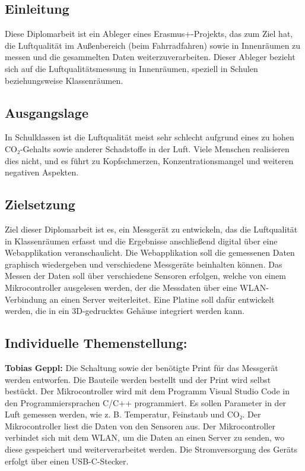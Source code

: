 \begin{inhalt}
\renewcommand*\chapterpagestyle{scrheadings}
\chapter{Einleitung}

Diese Diplomarbeit ist ein Ableger eines Erasmus+-Projekts, das zum Ziel hat, die Luftqualität im Außenbereich (beim Fahrradfahren) sowie in Innenräumen zu messen und die gesammelten Daten weiterzuverarbeiten. Dieser Ableger bezieht sich auf die Luftqualitätsmessung in Innenräumen, speziell in Schulen beziehungsweise Klassenräumen.

\section{Ausgangslage}

In Schulklassen ist die Luftqualität meist sehr schlecht aufgrund eines zu hohen CO₂-Gehalts sowie anderer Schadstoffe in der Luft. Viele Menschen realisieren dies nicht, und es führt zu Kopfschmerzen, Konzentrationsmangel und weiteren negativen Aspekten.

\section{Zielsetzung}

Ziel dieser Diplomarbeit ist es, ein Messgerät zu entwickeln, das die Luftqualität in Klassenräumen erfasst und die Ergebnisse anschließend digital über eine Webapplikation veranschaulicht. Die Webapplikation soll die gemessenen Daten graphisch wiedergeben und verschiedene Messgeräte beinhalten können. Das Messen der Daten soll über verschiedene Sensoren erfolgen, welche von einem Mikrocontroller ausgelesen werden, der die Messdaten über eine WLAN-Verbindung an einen Server weiterleitet. Eine Platine soll dafür entwickelt werden, die in ein 3D-gedrucktes Gehäuse integriert werden kann.

\section{Individuelle Themenstellung:}

\textbf{Tobias Geppl:}
Die Schaltung sowie der benötigte Print für das Messgerät werden entworfen. Die Bauteile werden bestellt und der Print wird selbst bestückt. Der Mikrocontroller wird mit dem Programm Visual Studio Code in den Programmiersprachen C/C++ programmiert. Es sollen Parameter in der Luft gemessen werden, wie z. B. Temperatur, Feinstaub und CO₂. Der Mikrocontroller liest die Daten von den Sensoren aus. Der Mikrocontroller verbindet sich mit dem WLAN, um die Daten an einen Server zu senden, wo diese gespeichert und weiterverarbeitet werden. Die Stromversorgung des Geräts erfolgt über einen USB-C-Stecker.


\end{inhalt}
